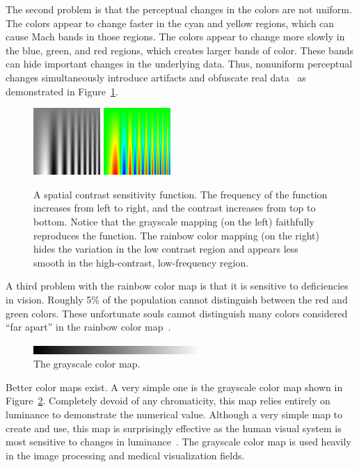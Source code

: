 \documentclass{acmsiggraph}               %
\newcommand{\lcite}[1]{~\cite{#1}}
\begin{document}
The second problem is that the perceptual changes in the colors are not
uniform.  The colors appear to change faster in the cyan and yellow
regions, which can cause Mach bands in those regions.  The colors appear to
change more slowly in the blue, green, and red regions, which creates larger
bands of color.  These bands can hide important changes in the
underlying data.  Thus, nonuniform perceptual changes
simultaneously introduce artifacts and obfuscate real
data\lcite{Borland07} as demonstrated in
Figure~\ref{fig:RainbowSpatialContrast}.

\begin{figure}
  \centering
  \includegraphics[width=1.0in]{images/GrayscaleSpatialContrast}
  \qquad
  \includegraphics[width=1.0in]{images/RainbowSpatialContrast}
  \caption{A spatial contrast sensitivity function.  The frequency of the
    function increases from left to right, and the contrast increases from
    top to bottom.  Notice that the grayscale mapping (on the left)
    faithfully reproduces the function.  The rainbow color mapping (on the
    right) hides the variation in the low contrast region and appears less
    smooth in the high-contrast, low-frequency region.}
  \label{fig:RainbowSpatialContrast}
\end{figure}

A third problem with the rainbow color map is that it is sensitive to
deficiencies in vision.  Roughly 5\% of the population cannot distinguish
between the red and green colors.  These unfortunate souls cannot
distinguish many colors considered ``far apart'' in the rainbow color
map\lcite{Light04}.

\begin{figure}
  \centering
  \includegraphics[width=2.5in]{images/GrayscaleBar}
  \caption{The grayscale color map.}
  \label{fig:GrayscaleColorMap}
\end{figure}
Better color maps exist.  A very simple one is the grayscale
color map shown in Figure~\ref{fig:GrayscaleColorMap}.  Completely devoid
of any chromaticity, this map relies entirely on luminance to demonstrate
the numerical value.  Although a very simple map to create and use, this
map is surprisingly effective as the human visual system is most sensitive
to changes in luminance\lcite{Mullen85,Ware04}.  The grayscale color map is
used heavily in the image processing and medical visualization fields.
\end{document}
